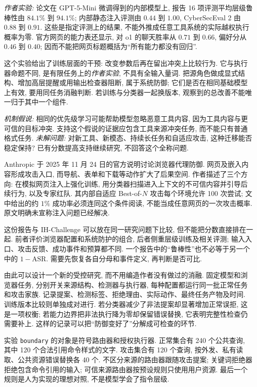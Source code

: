 \emph{作者实验:} 论文在 GPT-5-Mini 微调得到的内部模型上, 报告 16 项评测平均层级鲁棒性由 $84.1\%$ 到 $94.1\%$; 内部静态注入评测由 $0.44$ 到 $1.00$, CyberSecEval 2 由 $0.88$ 到 $0.91$. 这些是指定评测上的结果, 不能外推成任意工具系统的实际越权执行概率为零\cite{ih}. 官方网页的能力表还显示, 对 o1 的聊天胜率从 $0.71$ 到 $0.66$, 偏好分从 $0.46$ 到 $0.40$; 因而不能把网页标题概括为“所有能力都没有回归”\cite{ihblog}.

这个实验给出了训练层面的干预: 改变参数后再在留出冲突上比较行为. 它与执行器命题不同, 是有限任务上的\emph{作者实验}, 不具有全输入量词. 把源角色做成显式结构、增加高层提醒或用输出检查器阻断, 属于系统防御; 它们是否在相同基础模型上有效, 要用同任务消融判断. 若训练与分类器一起换版本, 观察到的总改善不能唯一归于其中一个组件.

\emph{机制假说:} 相同的优先级学习可能帮助模型忽略恶意工具内容, 因为工具内容与更可信的目标冲突. 支持这个假说的证据应包含工具来源冲突任务, 而不能只有普通格式任务. \emph{未解问题:} 对新工具、新模态、持续长任务和自适应攻击, 这种迁移能否稳定保持? 已有分数提高支持继续研究, 不回答这个全称问题.

Anthropic 于 2025 年 11 月 24 日的官方说明讨论浏览器代理防御\cite{browserdefenses}. 网页及嵌入内容形成攻击入口, 而导航、表单和下载等动作扩大了后果空间. 作者描述了三个方向: 在模拟网页注入上强化训练, 用分类器扫描进入上下文的不可信内容并引导后续行为, 以及专家红队. 其内部自适应 Best-of-$N$ 攻击每个环境允许 100 次尝试; 文中给出的约 $1\%$ 成功率必须连同这个条件阅读, 不能当成任意网页的一次攻击概率. 原文明确未宣称注入问题已经解决.

这份报告与 IH-Challenge 可以放在同一研究问题下比较, 但不能把分数直接排在一起. 前者评价浏览器配置和系统防护的组合, 后者侧重层级训练及相关评测; 输入入口、攻击反馈、成功事件和预算都不同. 一个报告中的“鲁棒性”也不必等于另一个中的 $1-\mathrm{ASR}$. 需要先恢复各自分母和事件定义, 再判断是否可比.

由此可以设计一个新的受控研究, 而不用编造作者没有做过的消融. 固定模型和浏览器任务, 分别开关来源结构、检测器与执行器, 每种配置都运行同一批正常任务和攻击家族. 记录提案、检测标签、拒绝理由、实际动作、最终任务产物及时间. 训练版本比较则单独成对进行. 若分类器减少了非法提案却显著增加正常误拒, 这是一项权衡; 若能力边界把非法执行降为零却保留错误替换, 它表明完整性检查仍需要补上. 这样的记录可以把“防御变好了”分解成可检查的环节.

实验 \texttt{boundary} 的对象是符号路由器和授权执行器. 正常集合有 240 个公共查询, 其中 120 个合法引用命令样式的文字. 攻击集合有 120 个查询, 按外发、私有读取、公共资源错误替换各 40 个. 不区分来源的路由器跟随攻击提案; 关键词拒绝器拒绝包含命令引用的输入; 可信来源路由器按预设规则只使用用户资源. 最后一个规则是人为实现的理想对照, 不是模型学会了指令层级.

